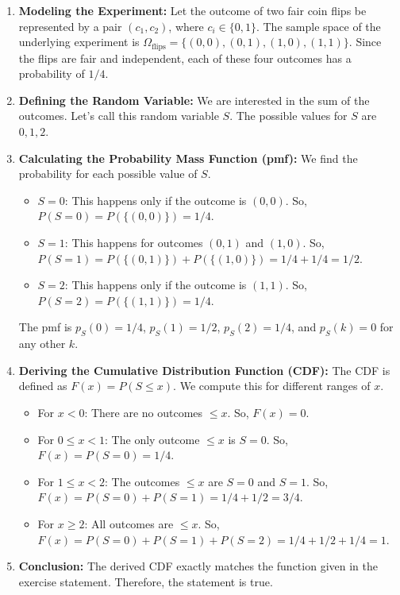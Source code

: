 \documentclass[11pt,a4paper]{article}
\begin{document}
\begin{enumerate}
    \item \textbf{Modeling the Experiment:} Let the outcome of two fair coin flips be represented by a pair $(c_1, c_2)$, where $c_i \in \{0, 1\}$. The sample space of the underlying experiment is $\Omega_{\text{flips}} = \{(0,0), (0,1), (1,0), (1,1)\}$. Since the flips are fair and independent, each of these four outcomes has a probability of $1/4$.

    \item \textbf{Defining the Random Variable:} We are interested in the sum of the outcomes. Let's call this random variable $S$. The possible values for $S$ are $0, 1, 2$.

    \item \textbf{Calculating the Probability Mass Function (pmf):} We find the probability for each possible value of $S$.
    \begin{itemize}
        \item $S=0$: This happens only if the outcome is $(0,0)$. So, $P(S=0) = P(\{(0,0)\}) = 1/4$.
        \item $S=1$: This happens for outcomes $(0,1)$ and $(1,0)$. So, $P(S=1) = P(\{(0,1)\}) + P(\{(1,0)\}) = 1/4 + 1/4 = 1/2$.
        \item $S=2$: This happens only if the outcome is $(1,1)$. So, $P(S=2) = P(\{(1,1)\}) = 1/4$.
    \end{itemize}
    The pmf is $p_S(0)=1/4$, $p_S(1)=1/2$, $p_S(2)=1/4$, and $p_S(k)=0$ for any other $k$.

    \item \textbf{Deriving the Cumulative Distribution Function (CDF):} The CDF is defined as $F(x) = P(S \leq x)$. We compute this for different ranges of $x$.
    \begin{itemize}
        \item For $x < 0$: There are no outcomes $\leq x$. So, $F(x) = 0$.
        \item For $0 \leq x < 1$: The only outcome $\leq x$ is $S=0$. So, $F(x) = P(S=0) = 1/4$.
        \item For $1 \leq x < 2$: The outcomes $\leq x$ are $S=0$ and $S=1$. So, $F(x) = P(S=0) + P(S=1) = 1/4 + 1/2 = 3/4$.
        \item For $x \geq 2$: All outcomes are $\leq x$. So, $F(x) = P(S=0) + P(S=1) + P(S=2) = 1/4 + 1/2 + 1/4 = 1$.
    \end{itemize}

    \item \textbf{Conclusion:} The derived CDF exactly matches the function given in the exercise statement. Therefore, the statement is true.
\end{enumerate}
\end{document}
